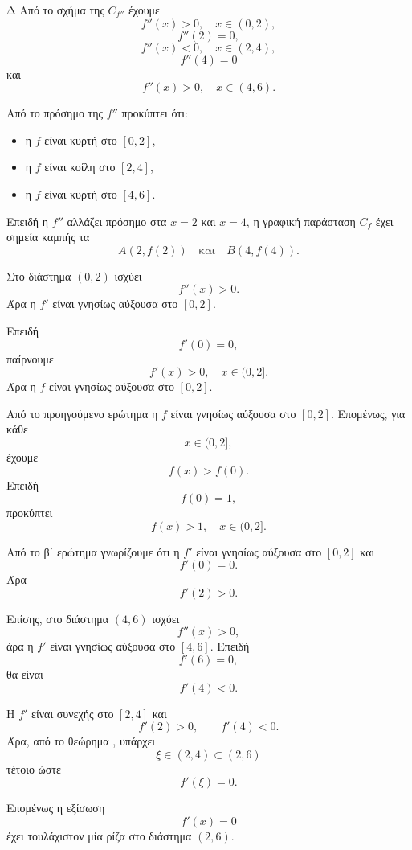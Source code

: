 \begin{thema}{Δ}
Από το σχήμα της $C_{f''}$ έχουμε
\[
f''(x)>0,\quad x\in(0,2),
\]
\[
f''(2)=0,
\]
\[
f''(x)<0,\quad x\in(2,4),
\]
\[
f''(4)=0
\]
και
\[
f''(x)>0,\quad x\in(4,6).
\]

\begin{erwthma}
\item Από το πρόσημο της $f''$ προκύπτει ότι:
\begin{itemize}
\item η $f$ είναι κυρτή στο $[0,2]$,
\item η $f$ είναι κοίλη στο $[2,4]$,
\item η $f$ είναι κυρτή στο $[4,6]$.
\end{itemize}

Επειδή η $f''$ αλλάζει πρόσημο στα $x=2$ και $x=4$, η γραφική
παράσταση $C_f$ έχει σημεία καμπής τα
\[
{A(2,f(2))}
\quad\text{και}\quad
{B(4,f(4))}.
\]

\item Στο διάστημα $(0,2)$ ισχύει
\[
f''(x)>0.
\]
Άρα η $f'$ είναι γνησίως αύξουσα στο $[0,2]$.

Επειδή
\[
f'(0)=0,
\]
παίρνουμε
\[
f'(x)>0,\quad x\in(0,2].
\]
Άρα η $f$ είναι γνησίως αύξουσα στο $[0,2]$.

\item Από το προηγούμενο ερώτημα η $f$ είναι γνησίως αύξουσα στο
$[0,2]$. Επομένως, για κάθε
\[
x\in(0,2],
\]
έχουμε
\[
f(x)>f(0).
\]
Επειδή
\[
f(0)=1,
\]
προκύπτει
\[
{f(x)>1,\quad x\in(0,2]}.
\]

\item Από το β΄ ερώτημα γνωρίζουμε ότι η $f'$ είναι γνησίως αύξουσα στο
$[0,2]$ και
\[
f'(0)=0.
\]
Άρα
\[
f'(2)>0.
\]

Επίσης, στο διάστημα $(4,6)$ ισχύει
\[
f''(x)>0,
\]
άρα η $f'$ είναι γνησίως αύξουσα στο $[4,6]$. Επειδή
\[
f'(6)=0,
\]
θα είναι
\[
f'(4)<0.
\]

Η $f'$ είναι συνεχής στο $[2,4]$ και
\[
f'(2)>0,\qquad f'(4)<0.
\]
Άρα, από το θεώρημα , υπάρχει
\[
\xi\in(2,4)\subset(2,6)
\]
τέτοιο ώστε
\[
f'(\xi)=0.
\]

Επομένως η εξίσωση
\[
f'(x)=0
\]
έχει τουλάχιστον μία ρίζα στο διάστημα $(2,6)$.
\end{erwthma}
\end{thema}

